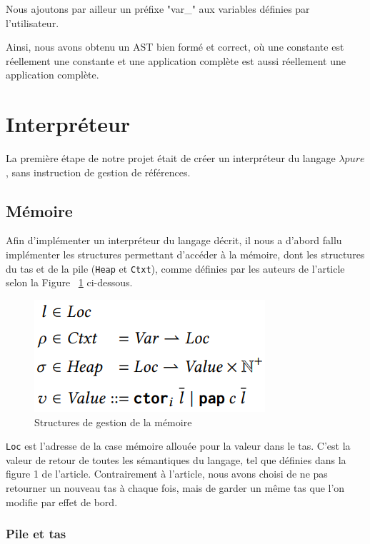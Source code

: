 \documentclass{rapportECL}
\begin{document}
Nous ajoutons par ailleur un préfixe "var\_" aux variables définies par l'utilisateur.

Ainsi, nous avons obtenu un AST bien formé et correct, où une constante est réellement une constante et une application
complète est aussi réellement une application complète.

\section{Interpréteur}

La première étape de notre projet était de créer un interpréteur du langage $\lambda{pure}$, sans instruction de gestion de références.

\subsection{Mémoire}

Afin d'implémenter un interpréteur du langage décrit, il nous a d'abord fallu implémenter les structures permettant d'accéder à la mémoire, 
dont les structures du tas et de la pile (\verb|Heap| et \verb|Ctxt|), comme définies par les auteurs de l'article selon la Figure ~\ref{fig:memory} ci-dessous.

\begin{figure}[hbt!]
	\centering
	\includegraphics[scale=0.80]{logos/figure_strutures_interpreteur.png}
	\caption{Structures de gestion de la mémoire} 
	\label{fig:memory}
\end{figure}
\FloatBarrier 


\verb|Loc| est l'adresse de la case mémoire allouée pour la valeur dans le tas. C'est la valeur de retour de toutes les sémantiques 
du langage, tel que définies dans la figure 1 de l'article\cite{ullrich_counting_2020}.
Contrairement à l'article, nous avons choisi de ne pas retourner un nouveau tas à chaque fois, mais de garder un même tas que 
l'on modifie par effet de bord.

\medskip

\subsubsection{Pile et tas}
\end{document}
